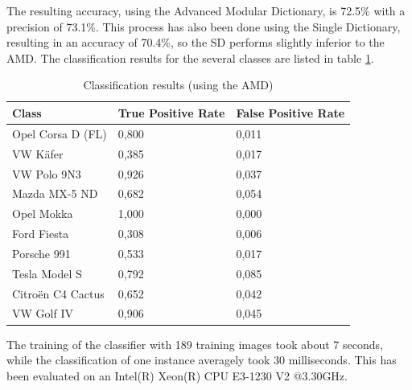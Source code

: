 The resulting accuracy, using the Advanced Modular Dictionary, is 72.5\% with a precision of 73.1\%. This process has also been done using the Single Dictionary, resulting in an accuracy of 70.4\%, so the SD performs slightly inferior to the AMD. The classification results for the several classes are listed in table \ref{table:classificationResults}.
\begin{table}[btph]
    \centering
    \begin{tabular}{ | l | l | l |}
    \hline
    \textbf{Class} & \textbf{True Positive Rate} & \textbf{False Positive Rate} \\ \hline
    Opel Corsa D (FL)  & 0,800 &  0,011 \\ \hline
    VW K\"afer & 	0,385 &  0,017 \\ \hline
    VW Polo 9N3  & 	0,926 &  0,037 \\ \hline
    Mazda MX-5 ND  & 0,682 &  0,054 \\ \hline
    Opel Mokka & 	1,000 &  0,000 \\ \hline
    Ford Fiesta  & 	0,308 &  0,006 \\ \hline
    Porsche 991  & 	0,533 &  0,017 \\ \hline
    Tesla Model S  & 0,792 &  0,085 \\ \hline
    Citro\"en C4 Cactus & 	0,652 &  0,042 \\ \hline
    VW Golf IV  & 	0,906 &  0,045 \\ \hline
    \end{tabular}
    \caption{Classification results (using the AMD)}
    \label{table:classificationResults}
\end{table}
The training of the classifier with 189 training images took about 7 seconds, while the classification of one instance averagely took 30 milliseconds. This has been evaluated on an Intel(R) Xeon(R) CPU E3-1230 V2 @3.30GHz.

